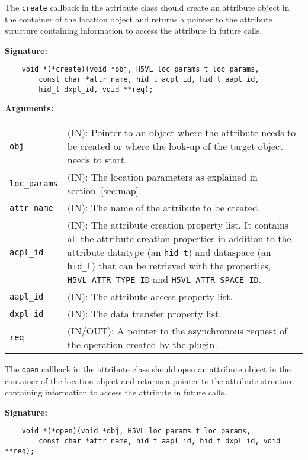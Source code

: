 The {\tt create} callback in the attribute class should create an
attribute object in the container of the location object and
returns a pointer to the attribute structure containing information to
access the attribute in future calls. 

\textbf{Signature:}
\begin{lstlisting}
    void *(*create)(void *obj, H5VL_loc_params_t loc_params, 
        const char *attr_name, hid_t acpl_id, hid_t aapl_id, 
        hid_t dxpl_id, void **req);
\end{lstlisting}

\textbf{Arguments:}\\
\begin{tabular}{l p{10cm}}
  {\tt obj} & (IN): Pointer to an object where the attribute needs
  to be created or where the look-up of the target object needs to
  start.\\
  {\tt loc\_params} & (IN): The location parameters as explained in
  section~\ref{sec:map}.\\
  {\tt attr\_name} & (IN): The name of the attribute to be created.\\
  {\tt acpl\_id} & (IN): The attribute creation property list. It contains
  all the attribute creation properties in addition to the attribute
  datatype (an {\tt hid\_t}) and dataspace (an {\tt hid\_t}) that can
  be retrieved with the properties, {\tt H5VL\_ATTR\_TYPE\_ID} and
  {\tt H5VL\_ATTR\_SPACE\_ID}.\\
  {\tt aapl\_id} & (IN): The attribute access property list.\\
  {\tt dxpl\_id} & (IN): The data transfer property list.\\
  {\tt req} & (IN/OUT): A pointer to the asynchronous request of the
  operation created by the plugin.\\
\end{tabular}

The {\tt open} callback in the attribute class should open an
attribute object in the container of the location object and returns a
pointer to the attribute structure containing information to access
the attribute in future calls. 

\textbf{Signature:}
\begin{lstlisting}
    void *(*open)(void *obj, H5VL_loc_params_t loc_params, 
        const char *attr_name, hid_t aapl_id, hid_t dxpl_id, void **req);
\end{lstlisting}

